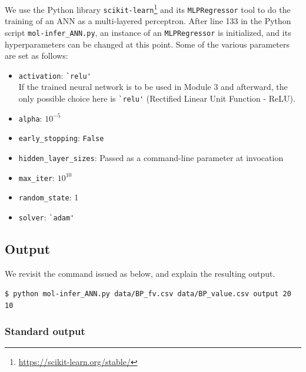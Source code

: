 \documentclass[11pt,titlepage,dvipdfmx,twoside]{book}
\begin{document}
We use the Python  library {\tt scikit-learn}\footnote{\url{https://scikit-learn.org/stable/}}
and its {\tt MLPRegressor} tool
to do the training of an ANN as
a multi-layered perceptron.
After line 133 in the Python script 
\verb|mol-infer_ANN.py|, an instance of 
an \verb|MLPRegressor| is initialized, 
and its hyperparameters can be changed at this point.
Some of the various parameters are set as follows:
\begin{itemize}
\item \verb|activation|: \verb|`relu'|  \\
{\color{red}{\bf Attention:} 
If the trained neural network is to be used in Module 3 and afterward, 
the only possible choice here is
\verb|`relu'| (Rectified Linear Unit Function - ReLU).}
\item \verb|alpha|: $10^{-5}$
\item \verb|early_stopping|: \verb|False|
\item \verb|hidden_layer_sizes|: Passed as a command-line parameter at invocation
\item \verb|max_iter|: $10^{10}$
\item \verb|random_state|: 1
\item \verb|solver|: \verb|`adam'|
\end{itemize}


\subsection{Output}

We revisit the command issued as below, 
and explain the resulting output.
\begin{oframed}
{\small
\verb|$ python mol-infer_ANN.py data/BP_fv.csv data/BP_value.csv output 20 10|
}
\end{oframed}

\subsubsection{Standard output}
\end{document}
